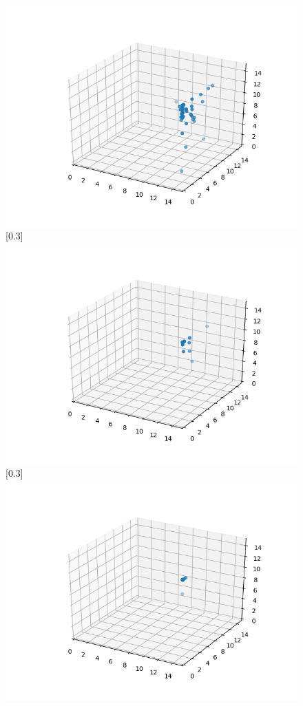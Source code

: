 \documentclass[11pt]{article} %
\begin{document}
\begin{figure}[ht]
{		\includegraphics[scale=0.3]{PSO03.png}
	}
	[0.3\linewidth]{
		\includegraphics[scale=0.3]{PSO04.png}
	}
	[0.3\linewidth]{
		\includegraphics[scale=0.3]{PSO05.png}
}
\end{figure}
\end{document}
